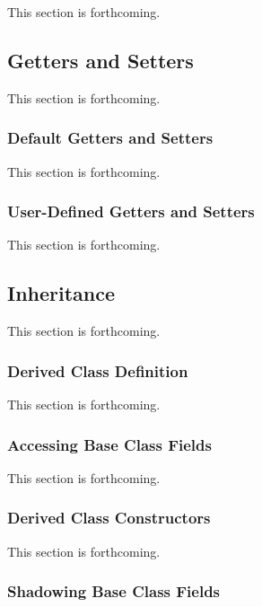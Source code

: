This section is forthcoming.

\subsection{Getters and Setters}
\label{Getters_and_Setters}

This section is forthcoming.

\subsubsection{Default Getters and Setters}
\label{Default_Getters_and_Setters}

This section is forthcoming.

\subsubsection{User-Defined Getters and Setters}
\label{User-Defined_Getters_and_Setters}

This section is forthcoming.

\subsection{Inheritance}
\label{Inheritance}

This section is forthcoming.

\subsubsection{Derived Class Definition}
\label{Derived_Class_Definition}

This section is forthcoming.

\subsubsection{Accessing Base Class Fields}
\label{Accessing_Base_Class_Fields}

This section is forthcoming.

\subsubsection{Derived Class Constructors}
\label{Derived_Class_Constructors}

This section is forthcoming.

\subsubsection{Shadowing Base Class Fields}
\label{Shadowing_Base_Class_Fields}

